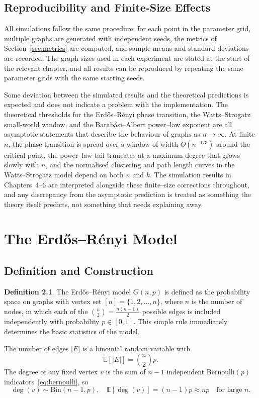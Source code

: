 \documentclass[12pt, a4paper]{report}
\theoremstyle{definition}
\newtheorem{definition}{Definition}[chapter]
\theoremstyle{plain}
\theoremstyle{remark}
\begin{document}
\section{Reproducibility and Finite-Size Effects}
\label{sec:reproducibility}

All simulations follow the same procedure: for each point in the
parameter grid, multiple graphs are generated with independent seeds,
the metrics of Section~\ref{sec:metrics} are computed, and sample means
and standard deviations are recorded. The graph sizes used in each
experiment are stated at the start of the relevant chapter, and all
results can be reproduced by repeating the same parameter grids with
the same starting seeds.

Some deviation between the simulated results and the theoretical
predictions is expected and does not indicate a problem with the
implementation. The theoretical thresholds for the Erd\H{o}s--R\'enyi
phase transition, the Watts--Strogatz small-world window, and the
Barab\'asi--Albert power--law exponent are all asymptotic statements
that describe the behaviour of graphs as $n \to \infty$. At finite $n$,
the phase transition is spread over a window of width $O(n^{-1/3})$
around the critical point, the power--law tail truncates at a maximum
degree that grows slowly with $n$, and the normalised clustering and
path length curves in the Watts--Strogatz model depend on both $n$ and
$k$. The simulation results in Chapters~4--6 are interpreted alongside
these finite--size corrections throughout, and any discrepancy from the
asymptotic prediction is treated as something the theory itself
predicts, not something that needs explaining away.
\chapter{The Erd\H{o}s--R\'{e}nyi Model}
\label{chap:er}

\section{Definition and Construction}
\label{sec:er_def}

\begin{definition}
  The Erd\H{o}s--R\'enyi model $G(n,p)$ is defined as the 
  probability space on graphs with vertex set 
  $[n] = \{1,2,\dots,n\}$, where $n$ is the number of nodes,
  in which each of the $\binom{n}{2} = \frac{n(n-1)}{2}$
  possible edges is included independently with probability 
  $p \in [0,1]$. This simple rule immediately determines 
  the basic statistics of the model.
\label{def:er}
\end{definition}
The number of edges $|E|$ is a binomial random variable with
\[
\mathbb{E}[|E|] = \binom{n}{2} p.
\]
The degree of any fixed vertex $v$ is the sum of $n-1$ independent
$\text{Bernoulli}(p)$ indicators~\eqref{eq:bernoulli}, so
\[
\deg(v) \sim \text{Bin}(n-1, p), \quad \mathbb{E}[\deg(v)] =
(n-1)p \approx np \quad \text{for large } n.
\]
\end{document}
